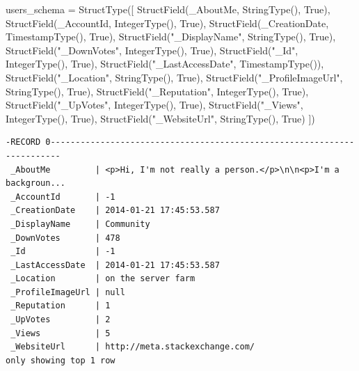 \documentclass[
  letterpaper,
  DIV=11,
  numbers=noendperiod]{scrreprt}
\newenvironment{Shaded}{\begin{snugshade}}{\end{snugshade}}
\newcommand{\NormalTok}[1]{\textcolor[rgb]{0.00,0.23,0.31}{#1}}
\newcommand{\OperatorTok}[1]{\textcolor[rgb]{0.37,0.37,0.37}{#1}}
\newcommand{\StringTok}[1]{\textcolor[rgb]{0.13,0.47,0.30}{#1}}
\newcommand{\VariableTok}[1]{\textcolor[rgb]{0.07,0.07,0.07}{#1}}
\begin{document}
\small

\begin{Shaded}
\begin{Highlighting}[]
\NormalTok{users\_schema }\OperatorTok{=}\NormalTok{ StructType([}
\NormalTok{    StructField(}\StringTok{\textquotesingle{}\_AboutMe\textquotesingle{}}\NormalTok{, StringType(), }\VariableTok{True}\NormalTok{),}
\NormalTok{    StructField(}\StringTok{\textquotesingle{}\_AccountId\textquotesingle{}}\NormalTok{, IntegerType(), }\VariableTok{True}\NormalTok{),}
\NormalTok{    StructField(}\StringTok{\textquotesingle{}\_CreationDate\textquotesingle{}}\NormalTok{, TimestampType(), }\VariableTok{True}\NormalTok{),}
\NormalTok{    StructField(}\StringTok{"\_DisplayName"}\NormalTok{, StringType(), }\VariableTok{True}\NormalTok{),}
\NormalTok{    StructField(}\StringTok{"\_DownVotes"}\NormalTok{, IntegerType(), }\VariableTok{True}\NormalTok{),}
\NormalTok{    StructField(}\StringTok{"\_Id"}\NormalTok{, IntegerType(), }\VariableTok{True}\NormalTok{),}
\NormalTok{    StructField(}\StringTok{"\_LastAccessDate"}\NormalTok{, TimestampType()),}
\NormalTok{    StructField(}\StringTok{"\_Location"}\NormalTok{, StringType(), }\VariableTok{True}\NormalTok{),}
\NormalTok{    StructField(}\StringTok{"\_ProfileImageUrl"}\NormalTok{, StringType(), }\VariableTok{True}\NormalTok{),}
\NormalTok{    StructField(}\StringTok{"\_Reputation"}\NormalTok{, IntegerType(), }\VariableTok{True}\NormalTok{),}
\NormalTok{    StructField(}\StringTok{"\_UpVotes"}\NormalTok{, IntegerType(), }\VariableTok{True}\NormalTok{),}
\NormalTok{    StructField(}\StringTok{"\_Views"}\NormalTok{, IntegerType(), }\VariableTok{True}\NormalTok{),}
\NormalTok{    StructField(}\StringTok{"\_WebsiteUrl"}\NormalTok{, StringType(), }\VariableTok{True}\NormalTok{)}
\NormalTok{])}
\end{Highlighting}
\end{Shaded}

\begin{verbatim}
-RECORD 0------------------------------------------------------------------------
 _AboutMe         | <p>Hi, I'm not really a person.</p>\n\n<p>I'm a backgroun... 
 _AccountId       | -1                                                           
 _CreationDate    | 2014-01-21 17:45:53.587                                      
 _DisplayName     | Community                                                    
 _DownVotes       | 478                                                          
 _Id              | -1                                                           
 _LastAccessDate  | 2014-01-21 17:45:53.587                                      
 _Location        | on the server farm                                           
 _ProfileImageUrl | null                                                         
 _Reputation      | 1                                                            
 _UpVotes         | 2                                                            
 _Views           | 5                                                            
 _WebsiteUrl      | http://meta.stackexchange.com/                               
only showing top 1 row
\end{verbatim}
\end{document}
